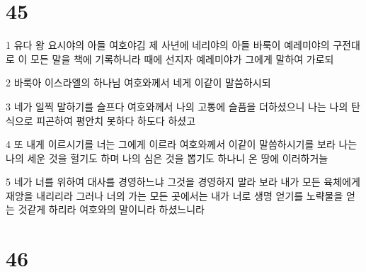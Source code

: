 \chapter{45}

\par 1 유다 왕 요시야의 아들 여호야김 제 사년에 네리야의 아들 바룩이 예레미야의 구전대로 이 모든 말을 책에 기록하니라 때에 선지자 예레미야가 그에게 말하여 가로되
\par 2 바룩아 이스라엘의 하나님 여호와께서 네게 이같이 말씀하시되
\par 3 네가 일찍 말하기를 슬프다 여호와께서 나의 고통에 슬픔을 더하셨으니 나는 나의 탄식으로 피곤하여 평안치 못하다 하도다 하셨고
\par 4 또 내게 이르시기를 너는 그에게 이르라 여호와께서 이같이 말씀하시기를 보라 나는 나의 세운 것을 헐기도 하며 나의 심은 것을 뽑기도 하나니 온 땅에 이러하거늘
\par 5 네가 너를 위하여 대사를 경영하느냐 그것을 경영하지 말라 보라 내가 모든 육체에게 재앙을 내리리라 그러나 너의 가는 모든 곳에서는 내가 너로 생명 얻기를 노략물을 얻는 것같게 하리라 여호와의 말이니라 하셨느니라

\chapter{46}

